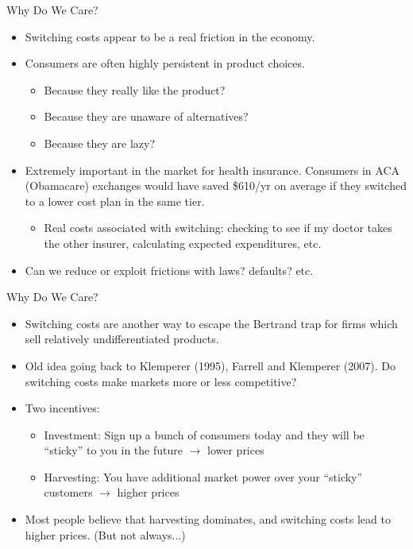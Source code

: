 \begin{frame}{Why Do We Care?}
\begin{itemize}
\item Switching costs appear to be a real friction in the economy.
\item Consumers are often highly persistent in product choices.
\begin{itemize}
\item Because they really like the product?
\item Because they are unaware of alternatives?
\item Because they are lazy?
\end{itemize}
\item Extremely important in the market for \alert{health insurance}. Consumers in ACA (Obamacare) exchanges would have saved \$610/yr on average if they switched to a lower cost plan in the same tier.
\begin{itemize}
\item Real costs associated with switching: checking to see if my doctor takes the other insurer, calculating expected expenditures, etc.
\end{itemize}
\item Can we reduce or exploit frictions with laws? defaults? etc.
\end{itemize}
\end{frame} 

\begin{frame}{Why Do We Care?}
\begin{itemize}
\item Switching costs are another way to escape the Bertrand trap for firms which sell relatively undifferentiated products.
\item Old idea going back to Klemperer (1995), Farrell and Klemperer (2007). Do switching costs make markets more or less competitive?
\item Two incentives:
\begin{itemize}
\item \alert{Investment}: Sign up a bunch of consumers today and they will be ``sticky'' to you in the future $\rightarrow$ \alert{lower prices}
\item \alert{Harvesting}: You have additional market power over your ``sticky'' customers $\rightarrow$ \alert{higher prices}
\end{itemize}
\item Most people believe that \alert{harvesting} dominates, and switching costs lead to \alert{higher} prices. (But not always...)
\end{itemize}
\end{frame} 

